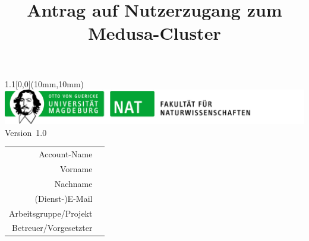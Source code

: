 \documentclass[paper=a4]{scrartcl}
\title{Antrag auf Nutzerzugang zum Medusa-Cluster}
\date{}
\begin{document}
\maketitle
\thispagestyle{empty}
\begin{textblock*}{1.1\linewidth}[0,0](10mm,10mm)%
  \includegraphics[width=\linewidth]{unibrief_logo_nat.png}%
  Version~1.0
\end{textblock*}

\vspace{-2.5cm}
\setlength{\extrarowheight}{1cm}

\begin{tabular}[]{rl}
  Account-Name & \uline{\hspace{10cm}} \\
  Vorname & \uline{\hspace{10cm}} \\
  Nachname & \uline{\hspace{10cm}} \\
  (Dienst-)E-Mail & \uline{\hspace{10cm}} \\
  Arbeitsgruppe/Projekt & \uline{\hspace{10cm}} \\
  Betreuer/Vorgesetzter & \uline{\hspace{10cm}} \\
\end{tabular}
\end{document}
